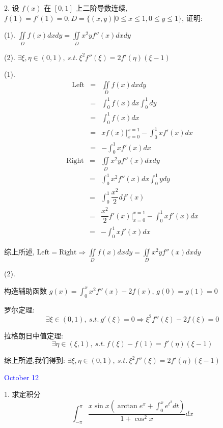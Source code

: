 2. 设 $f(x)$ 在 $[0,1]$ 上二阶导数连续, $f(1)=f'(1)=0, D=\{(x,y)|0\leq x\leq 1,0\leq y\leq 1\}$, 证明:

(1). $\displaystyle{\iint\limits_{D}f(x)dxdy=\iint\limits_{D}x^{2}yf''(x)dxdy}$

(2). $\exists \xi,\eta\in(0,1),\ s.t.\ \xi^{2}f''(\xi) = 2f'(\eta)(\xi-1)$

\begin{solution}

	(1). 
	\begin{eqnarray*}
		\text{Left} & = & \iint\limits_{D}f(x)dxdy\\
				    & = & \int_{0}^{1}f(x)dx\int_{0}^{1}dy\\
		            & = & \int_{0}^{1}f(x)dx\\
		            & = & xf(x)|_{x=0}^{x=1}-\int_{0}^{1}xf'(x)dx\\
		            & = & -\int_{0}^{1}xf'(x)dx
	\end{eqnarray*}
	\begin{eqnarray*}
		\text{Right} & = & \iint\limits_{D}x^2yf''(x)dxdy\\
					 & = & \int_{0}^{1}x^2f''(x)dx\int_{0}^{1}ydy\\
		             & = &\int_{0}^{1}\dfrac{x^2}{2}df'(x)\\
		             & = &\dfrac{x^2}{2}f'(x)|_{x=0}^{x=1}-\int_{0}^{1}xf'(x)dx\\
		             & = &-\int_{0}^{1}xf'(x)dx
	\end{eqnarray*}
	
	综上所述, $\text{Left}=\text{Right} \Rightarrow \displaystyle{\iint\limits_{D}f(x)dxdy=\iint\limits_{D}x^2yf''(x)dxdy}$
	
	(2).
	
	构造辅助函数 $g(x) = \int_{0}^{x} x^{2}f''(x)-2f(x)$, $g(0) = g(1) = 0$
	
	罗尔定理:  
	$$\exists \xi\in(0,1),\ s.t.\ g'(\xi) = 0\Rightarrow \xi^2f''(\xi)-2f(\xi) = 0$$
	
	拉格朗日中值定理:  
	$$\exists\eta\in(\xi,1),\ s.t.\ f(\xi)-f(1)=f'(\eta)(\xi-1)$$
	
	综上所述,我们得到:  $\exists \xi,\eta\in(0,1),\ s.t.\ \xi^2f''(\xi)=2f'(\eta)(\xi-1)$
\end{solution}


\textcolor{blue}{October 12}

1. 求定积分 
$$\displaystyle{\int_{-\pi}^{\pi}\dfrac{x\sin x\left( \arctan e^x+\int_{0}^{x}e^{t^2}dt\right) }{1+\cos^2 x}dx}$$


